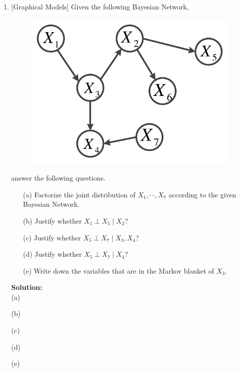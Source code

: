 \documentclass[10pt]{article}
\begin{document}
\begin{enumerate}[1.]
	\item {} [Graphical Models]
	Given the following Bayesian Network, 
	\begin{figure}[h]
		\label{fig:bn}
		\vskip 0.2in
		\begin{center}
		\centerline{\includegraphics[width=0.4\columnwidth]{figures/bn}}
		\end{center}
		\vskip -0.2in
	\end{figure}

	answer the following questions.
		\begin{itemize}
			\item[(a)] Factorize the joint distribution of $X_{1},\cdots,X_{7}$ according 
			to the given Bayesian Network.~ 
			\item[(b)] Justify whether $X_{1}\perp X_{5}\mid X_{2}$?~ 
			\item[(c)] Justify whether $X_{5}\perp X_{7}\mid X_{3},X_{4}$?~ 
			\item[(d)] Justify whether $X_{5}\perp X_{7}\mid X_{4}$?~ 
			\item[(e)] Write down the variables that are in the Markov blanket of $X_{3}$.~ 
		\end{itemize}

		\textbf{Solution:}\\
		(a)




		(b)




		(c)



		(d)




		(e)

		



\end{enumerate}
\end{document}
